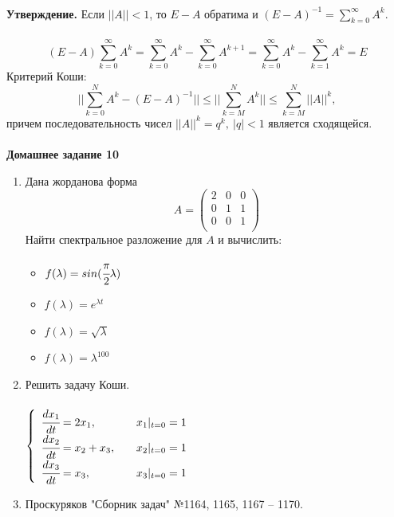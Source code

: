 \documentclass[12pt]{article}
\theoremstyle{definition}
\numberwithin{equation}{section}
\begin{document}
\\
\textbf{Утверждение.} Если $||A||<1$, то $E-A$ обратима и $(E-A)^{-1}=\sum\limits_{k=0}^{\infty}A^k$.\\
\\
$$(E-A)\sum\limits_{k=0}^{\infty}A^k=\sum\limits_{k=0}^{\infty}A^k-\sum\limits_{k=0}^{\infty}A^{k+1}=\sum\limits_{k=0}^{\infty}A^k-\sum\limits_{k=1}^{\infty}A^k=E$$
Критерий Коши: $$||\sum\limits_{k=0}^N A^k-(E-A)^{-1}||\leqslant||\sum\limits_{k=M}^N A^k||\leqslant \sum\limits_{k=M}^N||A||^k,$$
причем последовательность чисел $||A||^k=q^k,~|q|<1$ является сходящейся.\\ \\
\textbf{Домашнее задание 10}\begin{enumerate}
\item Дана жорданова форма 
\[A = \begin{pmatrix}
2 & 0 & 0\\
0 & 1 & 1\\
0 & 0 & 1\\
\end{pmatrix}\]
Найти спектральное разложение для $A$ и вычислить: 
\begin{itemize}
    \item $f(\lambda)=sin(\cfrac{\pi}{2}\lambda)$
    \item $f(\lambda)=e^{\lambda t}$
    \item $f(\lambda)=\sqrt{\lambda}$
    \item $f(\lambda)=\lambda^{100}$
\end{itemize}
\item Решить задачу Коши.\\ \\
$
\left\{
\begin{array}{lcl}
    \cfrac{dx_1}{dt}=2x_1, & & x_1|_{t=0}=1\\
    \cfrac{dx_2}{dt}=x_2+x_3, & & x_2|_{t=0}=1\\
    \cfrac{dx_3}{dt}=x_3, & & x_3|_{t=0}=1\\
\end{array}
\right.
$
\item Проскуряков "Сборник задач" №1164, 1165, 1167 -- 1170.
\end{enumerate}
~\\
\end{document}
